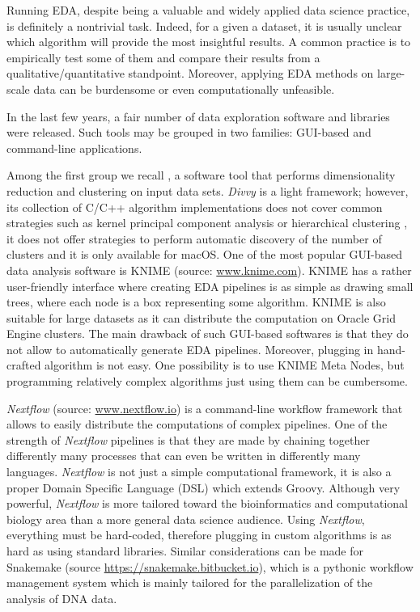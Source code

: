 Running EDA, despite being a valuable and widely applied data science practice, is definitely a nontrivial task.
Indeed, for a given a dataset, it is usually unclear which algorithm will provide the most insightful results. A common practice is to empirically test some of them and compare their results from a qualitative/quantitative standpoint.
Moreover, applying EDA methods on large-scale data can be burdensome or even computationally unfeasible.


In the last few years, a fair number of data exploration software and libraries were released. Such tools may be grouped in two families: \ac{GUI}-based and command-line applications.

Among the first group we recall  \cite{lewis2013divvy}, a software tool that performs dimensionality reduction and clustering on input data sets. \emph{Divvy} is a light framework; however, its collection of {C/C++} algorithm implementations does not cover common strategies such as kernel principal component analysis \cite{scholkopf1997kernel} or hierarchical clustering \cite{hastie2009elements}, it does not offer strategies to perform automatic discovery of the number of clusters and it is only available for macOS.
One of the most popular GUI-based data analysis software is {\sc KNIME} (source: \url{www.knime.com}). {\sc KNIME} has a rather user-friendly interface where creating EDA pipelines is as simple as drawing small trees, where each node is a box representing some algorithm. {\sc KNIME} is also suitable for large datasets as it can distribute the computation on Oracle Grid Engine clusters.
The main drawback of such GUI-based softwares is that they do not allow to automatically generate EDA pipelines. Moreover, plugging in hand-crafted algorithm is not easy. One possibility is to use {\sc KNIME} Meta Nodes, but programming relatively complex algorithms just using them can be cumbersome.

\textit{Nextflow} (source: \url{www.nextflow.io}) is a command-line workflow framework that allows to easily distribute the computations of complex pipelines. One of the strength of \textit{Nextflow} pipelines is that they are made by chaining together differently many processes that can even be written in differently many languages. \textit{Nextflow} is not just a simple computational framework, it is also a proper Domain Specific Language (\ac{DSL}) which extends Groovy.
Although very powerful, \textit{Nextflow} is more tailored toward the bioinformatics and computational biology area than a more general data science audience.
Using \textit{Nextflow}, everything must be hard-coded, therefore plugging in custom algorithms is as hard as using standard libraries.
Similar considerations can be made for Snakemake (source \url{https://snakemake.bitbucket.io}), which is a pythonic workflow management system which is mainly tailored for the parallelization of the analysis of DNA data.


